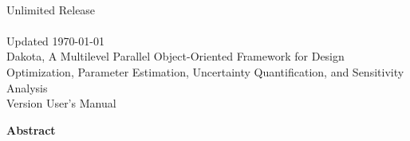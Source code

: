 \documentclass[letterpaper]{book}
\begin{document}
\begin{titlepage}
\setcounter{page}{3}
\begin{center}
{\large \DakotaSANDUsers}\\
{\large Unlimited Release}\\
{\large \DakotaSANDDate}\\
{\large Updated \today}\\

\vspace*{1.5cm}
{\LARGE Dakota, A Multilevel Parallel Object-Oriented Framework for 
Design Optimization, Parameter Estimation, Uncertainty Quantification, 
and Sensitivity Analysis}\\
\vspace*{1cm}
{\LARGE Version \DakotaVersion\space User's Manual}\\
\vspace*{1cm}

\DakotaAuthorFormatted
\vspace*{1cm}

\newpage

{\Large \bf Abstract}
\end{center}

\DakotaAbstractShared
\DakotaAbstractUsers

\end{titlepage}

\cleardoublepage
\tableofcontents
\cleardoublepage

\setcounter{secnumdepth}{-1} %

\setcounter{secnumdepth}{6} %



























\end{document}
